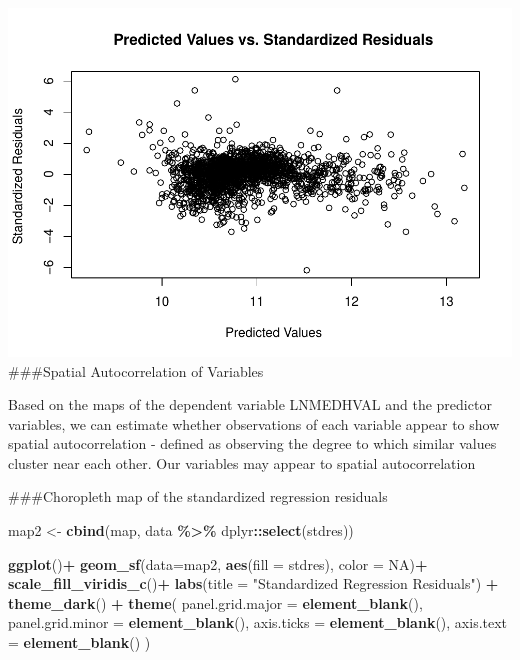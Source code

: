 \documentclass[
]{article}
\newenvironment{Shaded}{\begin{snugshade}}{\end{snugshade}}
\newcommand{\AttributeTok}[1]{\textcolor[rgb]{0.13,0.29,0.53}{#1}}
\newcommand{\ConstantTok}[1]{\textcolor[rgb]{0.56,0.35,0.01}{#1}}
\newcommand{\FunctionTok}[1]{\textcolor[rgb]{0.13,0.29,0.53}{\textbf{#1}}}
\newcommand{\NormalTok}[1]{#1}
\newcommand{\OtherTok}[1]{\textcolor[rgb]{0.56,0.35,0.01}{#1}}
\newcommand{\SpecialCharTok}[1]{\textcolor[rgb]{0.81,0.36,0.00}{\textbf{#1}}}
\newcommand{\StringTok}[1]{\textcolor[rgb]{0.31,0.60,0.02}{#1}}
\begin{document}
\includegraphics{HW1-Regression_files/figure-latex/plot_stand_resid-1.pdf}
\#\#\#Spatial Autocorrelation of Variables

Based on the maps of the dependent variable LNMEDHVAL and the predictor
variables, we can estimate whether observations of each variable appear
to show spatial autocorrelation - defined as observing the degree to
which similar values cluster near each other. Our variables may appear
to spatial autocorrelation

\#\#\#Choropleth map of the standardized regression residuals

\begin{Shaded}
\begin{Highlighting}[]
\NormalTok{map2 }\OtherTok{\textless{}{-}} \FunctionTok{cbind}\NormalTok{(map, data }\SpecialCharTok{\%\textgreater{}\%}\NormalTok{ dplyr}\SpecialCharTok{::}\FunctionTok{select}\NormalTok{(stdres))}

\FunctionTok{ggplot}\NormalTok{()}\SpecialCharTok{+}
  \FunctionTok{geom\_sf}\NormalTok{(}\AttributeTok{data=}\NormalTok{map2, }\FunctionTok{aes}\NormalTok{(}\AttributeTok{fill =}\NormalTok{ stdres), }\AttributeTok{color =} \ConstantTok{NA}\NormalTok{)}\SpecialCharTok{+}
  \FunctionTok{scale\_fill\_viridis\_c}\NormalTok{()}\SpecialCharTok{+}
  \FunctionTok{labs}\NormalTok{(}\AttributeTok{title =} \StringTok{"Standardized Regression Residuals"}\NormalTok{) }\SpecialCharTok{+}
  \FunctionTok{theme\_dark}\NormalTok{() }\SpecialCharTok{+}
  \FunctionTok{theme}\NormalTok{( }
    \AttributeTok{panel.grid.major =} \FunctionTok{element\_blank}\NormalTok{(),}
    \AttributeTok{panel.grid.minor =} \FunctionTok{element\_blank}\NormalTok{(),}
    \AttributeTok{axis.ticks =} \FunctionTok{element\_blank}\NormalTok{(),}
    \AttributeTok{axis.text =} \FunctionTok{element\_blank}\NormalTok{()}
\NormalTok{    )}
\end{Highlighting}
\end{Shaded}
\end{document}
